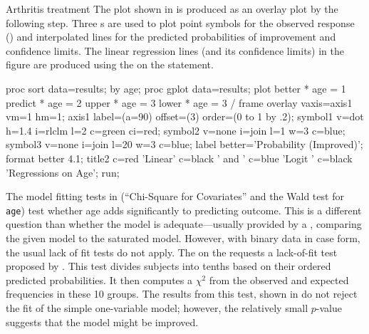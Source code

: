\begin{Example}[arthrit7]{Arthritis treatment}
The plot shown in  is produced
as an overlay plot by the
following  step.
Three s are used to plot point symbols
for the observed response () and
interpolated lines for the
predicted probabilities of improvement and confidence limits.
The linear regression lines (and its confidence limits) in the figure are produced using
the  on the  statement.
\begin{listing}
proc sort data=results;
   by age;
proc gplot data=results;
   plot better * age = 1
        predict * age = 2
        upper * age = 3
        lower * age = 3
        / frame overlay vaxis=axis1 vm=1 hm=1;
   axis1 label=(a=90) offset=(3) order=(0 to 1 by .2);
   symbol1 v=dot h=1.4 i=rlclm l=2 c=green ci=red;
   symbol2 v=none   i=join l=1  w=3 c=blue;
   symbol3 v=none   i=join l=20 w=3 c=blue;
   label better='Probability (Improved)';
   format better 4.1;
   title2  c=red 'Linear' c=black ' and ' c=blue 'Logit '
           c=black 'Regressions on Age';
run;
\end{listing}
The model fitting tests in 
(``Chi-Square for Covariates'' and the Wald test for \texttt{age})
test whether
age adds significantly to predicting outcome.
This is a different question than whether the model is adequate---usually
provided by a ,
comparing the given model to the saturated model.
However,
with binary data in case form, the usual lack of fit tests
do not apply.
The  on the 
requests a lack-of-fit test
proposed by \citet{HosmerLemeshow:89}.  This test divides subjects
into tenths based on their ordered predicted probabilities. It then computes a
\(\chi^2\) from the observed and expected frequencies in these 10 groups. 
The results from this test,
shown in  do not reject the fit of the simple
one-variable model;  however, the relatively small $p$-value suggests that the model
might be improved.
\begin{Output}[htbp]
\caption{Arthritis treatment data: Goodness-of-fit test}\label{out:logist1c.3}
\small

\end{Output}
\end{Example}


